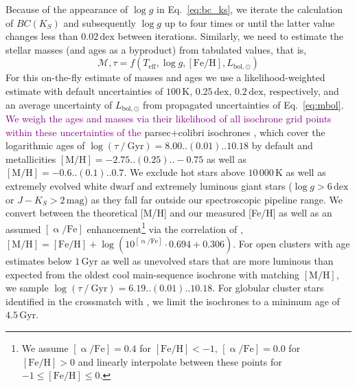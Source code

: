 \documentclass[
  journal=pasa,
  manuscript=research-paper, %
  year=2024,
  volume=37
]{cup-journal}
\newcommand{\adjusted}[1]{{\textcolor{purple}{#1}}}
\begin{document}
Because of the appearance of $\log g$ in Eq.~\ref{eq:bc_ks}, we iterate the calculation of $BC(K_S)$ and subsequently $\log g$ up to four times or until the latter value changes less than $0.02\,\mathrm{dex}$ between iterations. Similarly, we need to estimate the stellar masses (and ages as a byproduct) from tabulated values, that is,
\begin{equation}
\mathcal{M}, \tau = f(T_\mathrm{eff}, \log g, \mathrm{[Fe/H]}, L_\mathrm{bol,\odot})
\label{eq:mass_age}
\end{equation}
For this on-the-fly estimate of masses and ages we use a likelihood-weighted estimate with default uncertainties of $100\,\mathrm{K}$, $0.25\,\mathrm{dex}$, $0.2\,\mathrm{dex}$, respectively, and an average uncertainty of $L_\mathrm{bol,\odot}$ from propagated uncertainties of Eq.~\ref{eq:mbol}. \adjusted{We weigh the ages and masses via their likelihood of all isochrone grid points within these uncertainties of the} {\sc parsec+colibri} isochrones \citep{Bressan2012, Marigo2017}, which cover the logarithmic ages of $\log (\tau~/~\mathrm{Gyr}) = 8.00..(0.01)..10.18$ by default and metallicities $\mathrm{[M/H]} = -2.75..(0.25)..-0.75$ as well as $\mathrm{[M/H]} = -0.6..(0.1)..0.7$. We exclude hot stars above $10\,000\,\mathrm{K}$ as well as extremely evolved white dwarf and extremely luminous giant stars ($\log g > 6\,\mathrm{dex}$ or $J - K_S > 2\,\mathrm{mag}$) as they fall far outside our spectroscopic pipeline range. We convert between the theoretical [M/H] and our measured [Fe/H] as well as an assumed $\mathrm{[\upalpha/Fe]}$ enhancement\footnote{We assume $\mathrm{[\upalpha/Fe]} = 0.4$ for $\mathrm{[Fe/H]} < -1$, $\mathrm{[\upalpha/Fe]} = 0.0$ for $\mathrm{[Fe/H]} > 0$ and linearly interpolate between these points for $-1 \leq \mathrm{[Fe/H]} \leq 0$.} via the correlation of \citet{Salaris2006}, $\mathrm{[M/H]} = \mathrm{[Fe/H]} + \log\left(10^{\mathrm{[\upalpha/Fe]}} \cdot 0.694 + 0.306 \right)$. For open clusters with age estimates below $1\,\mathrm{Gyr}$ as well as unevolved stars that are more luminous than expected from the oldest cool main-sequence isochrone with matching $\mathrm{[M/H]}$, we sample $\log (\tau~/~\mathrm{Gyr}) = 6.19..(0.01)..10.18$. For globular cluster stars identified in the crossmatch with \citet{Baumgardt2021}, we limit the isochrones to a minimum age of $4.5\,\mathrm{Gyr}$.
\end{document}

